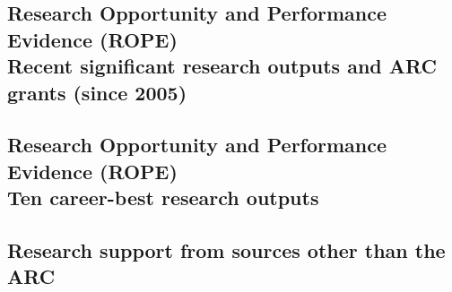 \documentclass[a4paper,fontsize=12pt]{scrartcl}
\begin{document}
\newpage
\setcounter{section}{6}
\setcounter{subsection}{11} %
\subsection{Research Opportunity and Performance Evidence (ROPE)\\
  Recent significant research outputs and ARC grants (since 2005)}
\label{sec:recent-significant-outputs}



\newpage
\subsection{Research Opportunity and Performance Evidence (ROPE)\\
  Ten career-best research outputs}
\label{sec:ten-best-outputs}



\newpage
\setcounter{section}{7} %
\setcounter{subsection}{0}
\subsection{Research support from sources other than the ARC}
\label{sec:other-research-support}



\appendix
\newpage
\end{document}
